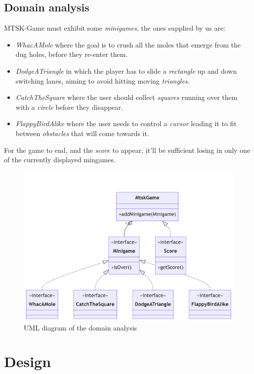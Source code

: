 \documentclass[a4paper,12pt]{report}
\begin{document}
\section{Domain analysis}

MTSK-Game must exhibit some \textit{minigames}, the ones supplied by us are:
\begin{itemize} 
	\item \textit{WhacAMole} where the goal is to crush all the moles that emerge from the dug holes, before they re-enter them.
	\item \textit{DodgeATriangle} in which the player has to slide a \textit{rectangle} up and down switching lanes, aiming to avoid hitting moving \textit{triangles}.
	\item \textit{CatchTheSquare} where the user should collect \textit{squares} running over them with a \textit{circle} before they disappear.
	\item \textit{FlappyBirdAlike} where the user needs to control a \textit{cursor} leading it to fit between \textit{obstacles} that will come towards it.
\end{itemize}
For the game to end, and the \textit{score} to appear, it'll be sufficient losing in only one of the currently displayed mingames.


\begin{figure}[ht]
	\centering{}
	\includegraphics[width=\textwidth]{res/mermaid-diagram-2022-12-24-032504.png}
	\caption{UML diagram of the domain analysis}
\end{figure}

\chapter{Design}
\end{document}
